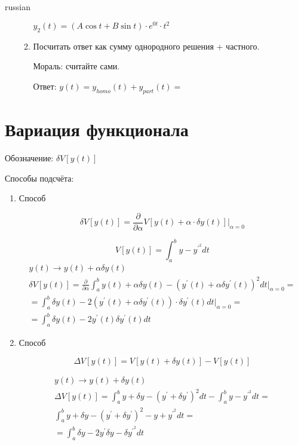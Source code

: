 \documentclass{article}
\begin{document}
\begin{otherlanguage*}{russian}
\begin{enumerate}
\begin{enumerate}
$ y_2 (t) = (A \cos t + B \sin t) \cdot e ^ {0 t} \cdot t ^ 2 $

\item Посчитать ответ как сумму однородного решения + частного. 

Мораль: считайте сами. 

Ответ: $ y(t) = y_{homo} (t) + y_{part} (t) = $
\end{enumerate}
\end{enumerate}
\section{\foreignlanguage{russian}{Вариация функционала}}
Обозначение: $ \delta V [y(t)] $ 

Способы подсчёта:
\begin{enumerate}
\item Способ

\begin{equation}
\delta V [y(t)] = \frac{\partial }{\partial \alpha} V[ y(t) + \alpha \cdot \delta y (t)]|_{\alpha = 0}
\end{equation} 

\begin{equation}
V [y(t)] = \int_a^b y - y^{'^{2}} dt 
\end{equation}
\begin{align}
y(t) \rightarrow y(t) + \alpha \delta y (t) \\
\delta V [ y(t)] = \frac{\partial}{\partial \alpha} \int_a^b y(t) + \alpha \delta y (t) - (y^{'} (t) + \alpha \delta y^{'} (t) ) ^ 2 dt |_{\alpha = 0} = \\
= \int_a^b \delta y (t) - 2 ( y^{'} (t) + \alpha \delta y^{'} (t) ) \cdot \delta y^{'} (t) dt |_{\alpha = 0} =  \\
= \int_a^b \delta y(t) - 2 y^{'}(t) \delta y^{'} (t) dt  
\end{align}

\item Способ 

\begin{equation}
\Delta V [y(t) ] = V [ y(t) + \delta y (t) ] - V [ y(t) ]
\end{equation}

\begin{align}
y(t) \rightarrow y(t) + \delta y(t) \\
\Delta V[y(t)] = \int_a^b y + \delta y - (y^{'} + \delta y ^{'}) ^ 2 dt - \int_a^b y - y^{'^{2}} dt = \\
\int_a^b y + \delta y - (y^{'} + \delta y ^{'}) ^ 2- y + y^{'^{2}} dt = \\
= \int_a^b \delta y - 2 y^{'} \delta y - \delta y^{'^2} dt 
\end{align}


\end{enumerate}
\end{otherlanguage*}
\end{document}
